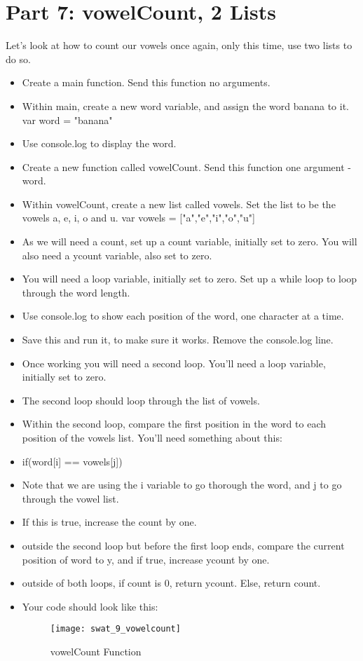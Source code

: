 \documentclass{article}
\begin{document}
\section*{Part 7: vowelCount, 2 Lists}
Let's look at how to count our vowels once again, only this time, use two lists to do so.
\begin{itemize}
    \item Create a main function.  Send this function no arguments.
    \item Within main, create a new word variable, and assign the word banana to it.  var word = "banana"
    \item Use console.log to display the word.
    \item Create a new function called vowelCount.  Send this function one argument - word.
    \item Within vowelCount, create a new list called vowels.  Set the list to be the vowels a, e, i, o and u.  var vowels = ["a","e","i","o","u"]
    \item As we will need a count, set up a count variable, initially set to zero.  You will also need a ycount variable, also set to zero.
    \item You will need a loop variable, initially set to zero.  Set up a while loop to loop through the word length.
    \item Use console.log to show each position of the word, one character at a time.
    \item Save this and run it, to make sure it works.  Remove the console.log line.
    \item Once working you will need a second loop.  You'll need a loop variable, initially set to zero.
    \item The second loop should loop through the list of vowels.
    \item Within the second loop, compare the first position in the word to each position of the vowels list.  You'll need something about this:
    \item if(word[i] == vowels[j])
    \item Note that we are using the i variable to go thorough the word, and j to go through the vowel list.
    \item If this is true, increase the count by one.
    \item outside the second loop but before the first loop ends, compare the current position of word to y, and if true, increase ycount by one.
    \item outside of both loops, if count is 0, return ycount.  Else, return count.
    \item Your code should look like this:
    \begin{figure}[H]
  		\centering
  		\texttt{[image: swat\_9\_vowelcount]}
  		\caption{vowelCount Function}
	\end{figure}
\end{itemize}
\end{document}
